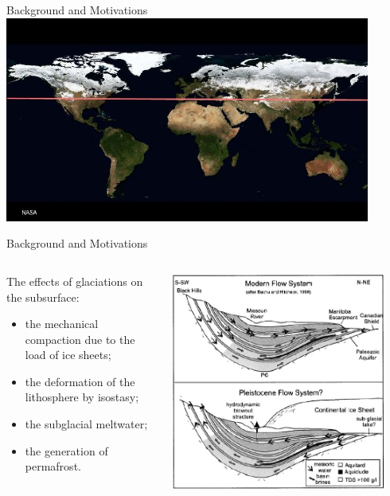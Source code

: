 \documentclass{beamer}
\begin{document}
\begin{frame}{Background and Motivations}
\centering
\includegraphics[width=0.9\textwidth]{figure/ice_age_snows}
\end{frame}
\begin{frame}{Background and Motivations}
\begin{columns}
\begin{column}{0.45\textwidth}
\begin{block}{The effects of glaciations on the subsurface:} 
\begin {itemize}
\item  the mechanical compaction due to the load of ice sheets; 
\item  the deformation of the lithosphere by isostasy; 
\item  the subglacial meltwater; 
\item  the generation of permafrost. 
\end{itemize}
\end{block}
\end{column}
\begin{column}{0.5\textwidth}
\includegraphics[width=0.9\textwidth]{figure/basin_glacial}
\end{column}
\end{columns}
\end{frame}
\end{document}
